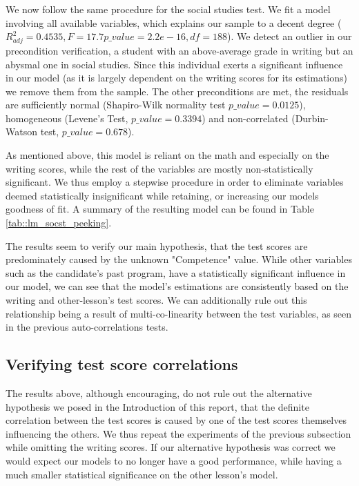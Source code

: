 \documentclass[10pt]{article}
\begin{document}
	We now follow the same procedure for the social studies test. We fit a model involving all available variables, which explains our sample to a decent degree ($R^2_{adj} = 0.4535, F= 17.7 p\_value=2.2e-16, df=188$). We detect an outlier in our precondition verification, a student with an above-average grade in writing but an abysmal one in social studies. Since this individual exerts a significant influence in our model (as it is largely dependent on the writing scores for its estimations) we remove them from the sample. The other preconditions are met, the residuals are sufficiently normal (Shapiro-Wilk normality test $p\_value = 0.0125$), homogeneous (Levene's Test, $p\_value = 0.3394$) and non-correlated (Durbin-Watson test, $p\_value=0.678$).
	
	As mentioned above, this model is reliant on the math and especially on the writing scores, while the rest of the variables are mostly non-statistically significant. We thus employ a stepwise procedure in order to eliminate variables deemed statistically insignificant while retaining, or increasing our models goodness of fit. A summary of the resulting model can be found in Table \ref{tab::lm_socst_peeking}.
	
	The results seem to verify our main hypothesis, that the test scores are predominately caused by the unknown "Competence" value. While other variables such as the candidate's past program, have a statistically significant influence in our model, we can see that the model's estimations are consistently based on the writing and other-lesson's test scores. We can additionally rule out this relationship being a result of multi-co-linearity between the test variables, as seen in the previous auto-correlations tests.
	
	
	
	
	
	\subsection{Verifying test score correlations}
	
	The results above, although encouraging, do not rule out the alternative hypothesis we posed in the Introduction of this report, that the definite correlation between the test scores is caused by one of the test scores themselves influencing the others. We thus repeat the experiments of the previous subsection while omitting the writing scores. If our alternative hypothesis was correct we would expect our models to no longer have a good performance, while having a much smaller statistical significance on the other lesson's model.
	
\end{document}
